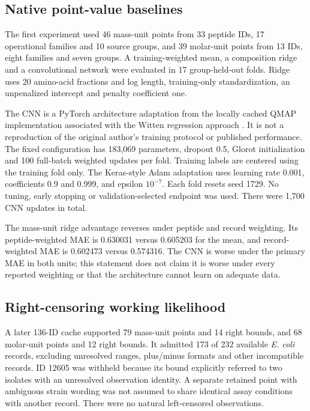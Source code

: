\documentclass[11pt,a4paper]{article}
\begin{document}
\subsection*{Native point-value baselines}
The first experiment used 46 mass-unit points from 33 peptide IDs, 17 operational families and 10 source groups, and 39 molar-unit points from 13 IDs, eight families and seven groups. A training-weighted mean, a composition ridge and a convolutional network were evaluated in 17 group-held-out folds. Ridge uses 20 amino-acid fractions and log length, training-only standardization, an unpenalized intercept and penalty coefficient one.

The CNN is a PyTorch architecture adaptation from the locally cached QMAP implementation associated with the Witten regression approach \cite{ref13,ref12}. It is not a reproduction of the original author's training protocol or published performance. The fixed configuration has 183,069 parameters, dropout 0.5, Glorot initialization and 100 full-batch weighted updates per fold. Training labels are centered using the training fold only. The Keras-style Adam adaptation uses learning rate 0.001, coefficients 0.9 and 0.999, and epsilon $10^{-7}$. Each fold resets seed 1729. No tuning, early stopping or validation-selected endpoint was used. There were 1,700 CNN updates in total.

The mass-unit ridge advantage reverses under peptide and record weighting. Its peptide-weighted MAE is 0.630031 versus 0.605203 for the mean, and record-weighted MAE is 0.602473 versus 0.574316. The CNN is worse under the primary MAE in both units; this statement does not claim it is worse under every reported weighting or that the architecture cannot learn on adequate data.

\subsection*{Right-censoring working likelihood}
A later 136-ID cache supported 79 mass-unit points and 14 right bounds, and 68 molar-unit points and 12 right bounds. It admitted 173 of 232 available \textit{E. coli} records, excluding unresolved ranges, plus/minus formats and other incompatible records. ID 12605 was withheld because its bound explicitly referred to two isolates with an unresolved observation identity. A separate retained point with ambiguous strain wording was not assumed to share identical assay conditions with another record. There were no natural left-censored observations.
\end{document}
